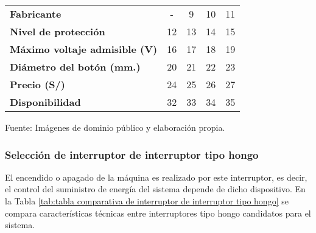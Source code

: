 \begin{mytable}[H]
\begin{tabular}{l|c|c|c|c|}
\begin{minipage}{\mythirdmaxsizeofcontenttable}
		\end{minipage}  \\ \hline
		\multicolumn{1}{|l|}{\textbf{Fabricante}}               & -                                                                     & 9          & 10         & 11         \\ \hline
		\multicolumn{1}{|l|}{\textbf{Nivel de protección}}      & 12                                                                    & 13         & 14         & 15         \\ \hline
		\multicolumn{1}{|l|}{
			\begin{minipage}{\myforthmaxsizeofcontenttable}			
				\textbf{Máximo voltaje admisible (V)}
			\end{minipage}
		}
		&
		16
		& 17         & 18         & 19         \\ \hline
		\multicolumn{1}{|l|}{
			\begin{minipage}{\myforthmaxsizeofcontenttable}			
				\textbf{Diámetro del botón (mm.)}
			\end{minipage}
		} & 20                                                                    & 21         & 22         & 23         \\ \hline
		\multicolumn{1}{|l|}{\textbf{Precio (S/)}}              & 24                                                                    & 25         & 26         & 27         \\ \hline
		\multicolumn{1}{|l|}{\textbf{Disponibilidad}}           & 32                                                                    & 33         & 34         & 35         \\ \hline
	\end{tabular}
	\begin{flushleft}	
		Fuente: Imágenes de dominio público y elaboración propia.
	\end{flushleft}
\end{mytable}


\subsubsection{Selección de interruptor de interruptor tipo hongo}

El encendido o apagado de la máquina es realizado por este interruptor, es decir, el control del suministro de energía del sistema depende de dicho dispositivo. En la Tabla \ref{tab:tabla comparativa de interruptor de interruptor tipo hongo} se compara características técnicas entre interruptores tipo hongo candidatos para el sistema.

